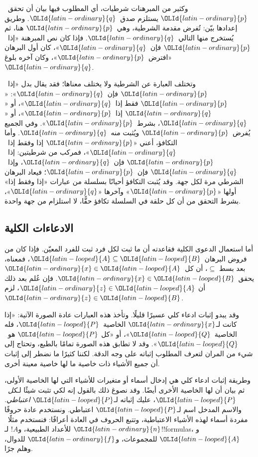 \documentclass[../../../include/open-logic-section]{subfiles}
\begin{document}
وكثير من المبرهنات شرطيات، أي المطلوب فيها بيان أن تحقق~$\OLId{latin-ordinary}{p}$ يستلزم
صدق~$\OLId{latin-ordinary}{q}$. وطريق إعدادها بيّن: تُفرض مقدمة الشرطية، وهي~$\OLId{latin-ordinary}{p}$ هنا، ثم
يُستخرج منها التالي~$\OLId{latin-ordinary}{q}$. فإذا كان نص المبرهنة «إذا~$\OLId{latin-ordinary}{p}$ فإن~$\OLId{latin-ordinary}{q}$»، كان
أول البرهان «افترض~$\OLId{latin-ordinary}{p}$»، وكان آخره بلوغ~$\OLId{latin-ordinary}{q}$.

وتختلف العبارة عن الشرطية ولا يختلف معناها؛ فقد يقال بدل «إذا~$\OLId{latin-ordinary}{p}$
فإن~$\OLId{latin-ordinary}{q}$»: «$\OLId{latin-ordinary}{p}$ فقط إذا~$\OLId{latin-ordinary}{q}$»، أو «$\OLId{latin-ordinary}{q}$ إذا~$\OLId{latin-ordinary}{p}$»، أو «$\OLId{latin-ordinary}{q}$، بشرط~$\OLId{latin-ordinary}{p}$».
وفي الجميع يُفرض~$\OLId{latin-ordinary}{p}$ ويُثبت منه~$\OLId{latin-ordinary}{q}$. وأما التكافؤ، أعني «$\OLId{latin-ordinary}{p}$ إذا
وفقط إذا~$\OLId{latin-ordinary}{q}$»، فمركب من شرطيتين: إذا~$\OLId{latin-ordinary}{p}$ فإن~$\OLId{latin-ordinary}{q}$، وإذا~$\OLId{latin-ordinary}{q}$ فإن~$\OLId{latin-ordinary}{p}$؛
فيعاد البرهان الشرطي مرة لكل جهة. وقد يُثبت التكافؤ أحيانًا بسلسلة
من عبارات «إذا وفقط إذا» أولها «$\OLId{latin-ordinary}{p}$» وآخرها «$\OLId{latin-ordinary}{q}$»، بشرط التحقق من أن
كل حلقة في السلسلة تكافؤ حقًّا، لا استلزام من جهة واحدة.

\subsection{الادعاءات الكلية}

أما استعمال الدعوى الكلية فقاعدته أن ما ثبت لكل فرد ثبت للفرد
المعيّن. فإذا كان من فروض البرهان~$\OLId{latin-looped}{A} \subseteq \OLId{latin-looped}{B}$، فمعناه، بعد بسط
$\subseteq$، أن كل~$\OLId{latin-ordinary}{x} \in \OLId{latin-looped}{A}$ يحقق~$\OLId{latin-ordinary}{x} \in \OLId{latin-looped}{B}$. فإن عُلم بعد ذلك أن
$\OLId{latin-ordinary}{z} \in \OLId{latin-looped}{A}$، لزم~$\OLId{latin-ordinary}{z} \in \OLId{latin-looped}{B}$.

وقد يبدو إثبات ادعاء كلي عسيرًا قليلًا. وتأخذ هذه العبارات عادة
الصورة الآتية: «إذا كانت لـ$\OLId{latin-ordinary}{x}$ الخاصية~$\OLId{latin-looped}{P}$، فله الخاصية~$\OLId{latin-looped}{Q}$»، أو «كل
$\OLId{latin-looped}{P}$ هو~$\OLId{latin-looped}{Q}$». وقد لا تطابق هذه الصورة تمامًا بالطبع، وتحتاج إلى شيء
من المران لتعرف المطلوب إثباته على وجه الدقة. لكننا كثيرًا ما نضطر
إلى إثبات أن جميع الأشياء ذات خاصية ما لها خاصية معينة أخرى.

وطريقة إثبات ادعاء كلي هي إدخال أسماء أو متغيرات للأشياء التي لها
الخاصية الأولى، ثم بيان أن لها الخاصية الأخرى أيضًا. وقد نصوغ ذلك
بالقول إنه لكي تثبت شيئًا لـ\emph{كل}~$\OLId{latin-looped}{P}$، عليك إثباته لـ$\OLId{latin-looped}{P}$
\emph{اعتباطي}. والاسم المدخل اسم لـ$\OLId{latin-looped}{P}$ اعتباطي. ونستخدم عادة حروفًا
مفردة أسماء لهذه الأشياء الاعتباطية، وتتبع الحروف في العادة أعرافًا:
فنستخدم مثلًا~$\OLId{latin-ordinary}{n}$ للأعداد الطبيعية، و$!A$ لـ!!{formula}s، و$\OLId{latin-looped}{A}$
للمجموعات، و$\OLId{latin-ordinary}{f}$ للدوال، وهلم جرًا.
\end{document}
